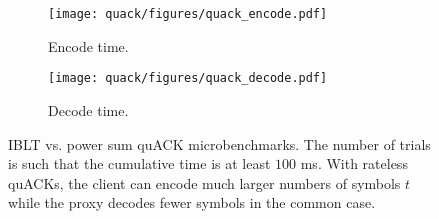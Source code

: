\begin{figure}[t]
    \centering
    \begin{subfigure}[b]{0.49\linewidth}
        \centering
        \texttt{[image: quack/figures/quack\_encode.pdf]}
        \caption{Encode time.}
        \label{fig:quack:iblt-computation:encode}
    \end{subfigure}
    \begin{subfigure}[b]{0.49\linewidth}
        \centering
        \texttt{[image: quack/figures/quack\_decode.pdf]}
        \caption{Decode time.}
        \label{fig:quack:iblt-computation:decode}
    \end{subfigure}
    \caption{IBLT vs. power sum quACK microbenchmarks. The number of trials is
     such that the cumulative time is at least $100$ ms. With rateless quACKs,
     the client can encode much larger numbers of symbols $t$ while the proxy
     decodes fewer symbols in the common case.
     }
    \label{fig:quack:iblt-computation}
\end{figure}